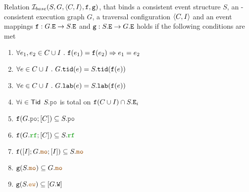 \documentclass[12pt]{article}
\begin{document}
\begin{definition}
  Relation $\mathcal{I}_{base}(S, G, \langle C, I \rangle, {\mathtt{f}}, {\mathtt{g}})$, that binds a 
  consistent event structure $S$, an \imm-consistent execution graph $G$,
  a traversal configuration $\langle C, I \rangle$
  and an event mappings ${\mathtt{f}} : G.{\mathtt{E}} \rightarrow S.{\mathtt{E}}$ and ${\mathtt{g}} : S.{\mathtt{E}} \rightarrow G.{\mathtt{E}}$
  holds if the following conditions are met
  \begin{enumerate}[label={$\boldsymbol{\simR}_{\arabic*}$.},align=left]

    \item \label{item:sim-finj}
    $\forall{e_1, e_2 \in C \cup I} ~.~ {\mathtt{f}}(e_1) = {\mathtt{f}}(e_2) \Rightarrow e_1 = e_2$

    \item \label{item:sim-ftid}
    $\forall{e \in C \cup I} ~.~ G.{\mathtt{tid}}(e) = S.{\mathtt{tid}}({\mathtt{f}}(e))$

    \item \label{item:sim-flab}
    $\forall{e \in C \cup I} ~.~ G.{\mathtt{lab}}(e) = S.{\mathtt{lab}}({\mathtt{f}}(e))$

    \item \label{item:sim-po-tot}
    $\forall{i \in \mathsf{Tid}}$
    $S.\lPO$ is total on ${\mathtt{f}}(C \cup I) \cap S.{\mathtt{E}}_{i}$

    \item \label{item:sim-po-in}
    $\f(G.\lPO;[C]) \subseteq S.\lPO$
    
    \item \label{item:sim-rf-in}
    $\f(G.\lRF;[C]) \subseteq S.\lRF$

    \item \label{item:sim-mo-in}
    $\f([I];G.\lMO;[I]) \subseteq S.\lMO$

    \item \label{item:sim-mo-pre}
    $\g(S.\lMO) \subseteq G.\lMO$

    \item \label{item:sim-ew-id}
    $\g(S.\lEW) \subseteq [G.\lW]$
    
  \end{enumerate}
\end{definition}
\end{document}
